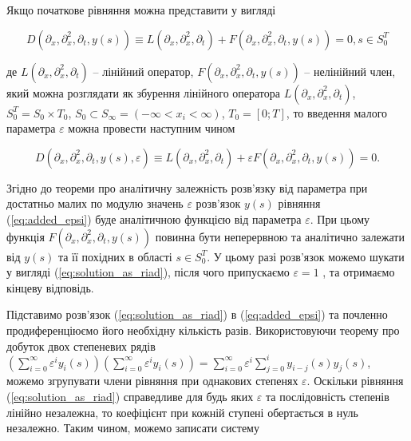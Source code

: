 Якщо початкове рівняння можна представити у вигляді

$$
D(\partial_x, \partial_x^2, \partial_t, y(s)) \equiv L(\partial_x, \partial_x^2, \partial_t) +
F(\partial_x, \partial_x^2, \partial_t, y(s)) = 0, s\in S_0^T
$$

де $L(\partial_x, \partial_x^2, \partial_t)$ – лінійний оператор, $F(\partial_x, \partial_x^2, \partial_t, y(s))$
– нелінійний член, який можна розглядати як збурення лінійного оператора $L(\partial_x, \partial_x^2, \partial_t)$,
$ S_0^T = S_0 \times T_0$, $ S_0 \subset S_\infty = \left(-\infty < x_i < \infty \right) $,
$ T_0 = \left[0; T\right] $, то введення малого параметра $\varepsilon$ можна провести наступним чином \cite{Kozdoba-Reshenie}

\begin{equation}
\label{eq:added_epsi}
D(\partial_x, \partial_x^2, \partial_t, y(s), \varepsilon) \equiv L(\partial_x, \partial_x^2, \partial_t) +
\varepsilon F(\partial_x, \partial_x^2, \partial_t, y(s)) = 0.
\end{equation}

Згідно до теореми про аналітичну залежність розв’язку від параметра \cite{Elsgoltz-Differentsialnye}
при достатньо малих по модулю значень $\varepsilon$
розв’язок $ y(s)$ рівняння (\ref{eq:added_epsi}) буде аналітичною функцією від параметра $\varepsilon$.
При цьому функція $ F(\partial_x, \partial_x^2, \partial_t, y(s))$ повинна бути
неперервною та аналітично залежати від $ y(s)$ та її похідних в області $ s\in S_0^T$. У цьому разі розв’язок можемо
шукати у вигляді (\ref{eq:solution_as_riad}), після чого припускаємо $\varepsilon = 1$ , та отримаємо кінцеву відповідь.

Підставимо розв’язок (\ref{eq:solution_as_riad}) в (\ref{eq:added_epsi}) та почленно продиференціюємо
його необхідну кількість разів. Використовуючи
теорему про добуток двох степеневих рядів
$\left(\sum_{i=0}^\infty \varepsilon^i y_i(s)\right)\left(\sum_{i=0}^\infty \varepsilon^i y_i(s)\right) =
\sum_{i=0}^\infty \varepsilon^i \sum_{j=0}^i y_{i-j}(s)y_j(s)$,
можемо згрупувати члени рівняння при однакових степенях $\varepsilon$. Оскільки
рівняння (\ref{eq:solution_as_riad}) справедливе для будь яких $\varepsilon$ та послідовність степенів  лінійно незалежна, то коефіцієнт при кожній
ступені обертається в нуль незалежно. Таким чином, можемо записати систему

